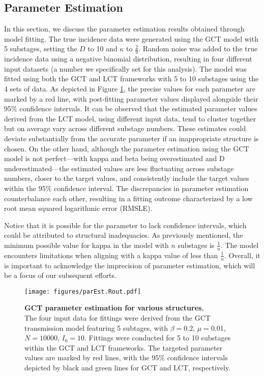 \documentclass[12pt]{article}
\begin{document}
\subsection{Parameter Estimation}
\label{parm est}
In this section, we discuss the parameter estimation results obtained through model fitting. The true incidence data were generated using the GCT model with 5 substages, setting the $D$ to 10 and $\kappa$ to $\frac{2}{9}$. Random noise was added to the true incidence data using a negative binomial distribution, resulting in four different input datasets (a number we specifically set for this analysis). The model was fitted using both the GCT and LCT frameworks with 5 to 10 substages using the 4 sets of data. As depicted in Figure \ref{parEst}, the precise values for each parameter are marked by a red line, with post-fitting parameter values displayed alongside their 95\% confidence intervals. It can be observed that the estimated parameter values derived from the LCT model, using different input data, tend to cluster together but on average vary across different substage numbers. These estimates could deviate substantially from the accurate parameter if an inappropriate structure is chosen. On the other hand, although the parameter estimation using the GCT model is not perfect—with kappa and beta being overestimated and D underestimated—the estimated values are less fluctuating across substage numbers, closer to the target values, and consistently include the target values within the 95\% confidence interval. The discrepancies in parameter estimation counterbalance each other, resulting in a fitting outcome characterized by a low root mean squared logarithmic error (RMSLE).

Notice that it is possible for the parameter to lack confidence intervals, which could be attributed to structural inadequacies. As previously mentioned, the minimum possible value for kappa in the model with $n$ substages is $\frac{1}{n}$. The model encounters limitations when aligning with a kappa value of less than $\frac{1}{n}$. Overall, it is important to acknowledge the imprecision of parameter estimation, which will be a focus of our subsequent efforts.

\begin{figure}[h!]
    \centering
    \texttt{[image: figures/parEst.Rout.pdf]}
    \caption{\textbf{GCT parameter estimation for various structures.} \\ The four input data for fittings were derived from the GCT transmission model featuring 5 subtages, with $\beta=0.2$, $\mu=0.01$, $N=10000$, $I_0=10$. Fittings were conducted for 5 to 10 substages within the GCT and LCT frameworks. The targeted parameter values are marked by red lines, with the 95\% confidence intervals depicted by black and green lines for GCT and LCT, respectively.}
    \label{parEst}
\end{figure}
\end{document}
